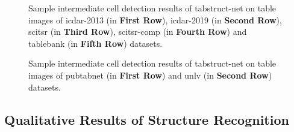 \documentclass[runningheads]{llncs}
\begin{document}
\begin{figure}[ht!]
\begin{center}
\vspace{0.001\textwidth}
\hspace{-0.01\textwidth}
\hspace{-0.01\textwidth}
\end{center}
\caption{Sample intermediate cell detection results of {\sc t}ab{\sc s}truct-{\sc n}et on table images of {\sc icdar-2013} (in \textbf{First Row}), {\sc icdar-2019} (in \textbf{Second Row}), {\sc s}ci{\sc tsr} (in \textbf{Third Row}), {\sc s}ci{\sc tsr-comp} (in \textbf{Fourth Row}) and {\sc t}able{\sc b}ank (in \textbf{Fifth Row}) datasets.}
\label{fig_cell1}
\end{figure}

\begin{figure}[t]
\begin{center}
\hspace{-0.01\textwidth}
\hspace{-0.01\textwidth}
\hspace{-0.01\textwidth}
\hspace{-0.01\textwidth}
\end{center}
\caption{Sample intermediate cell detection results of {\sc t}ab{\sc s}truct-{\sc n}et on table images of {\sc p}ub{\sc t}ab{\sc n}et (in \textbf{First Row}) and {\sc unlv} (in \textbf{Second Row}) datasets.}
\label{fig_cell2}
\end{figure}

\newpage
\subsection*{Qualitative Results of Structure Recognition}
\end{document}
